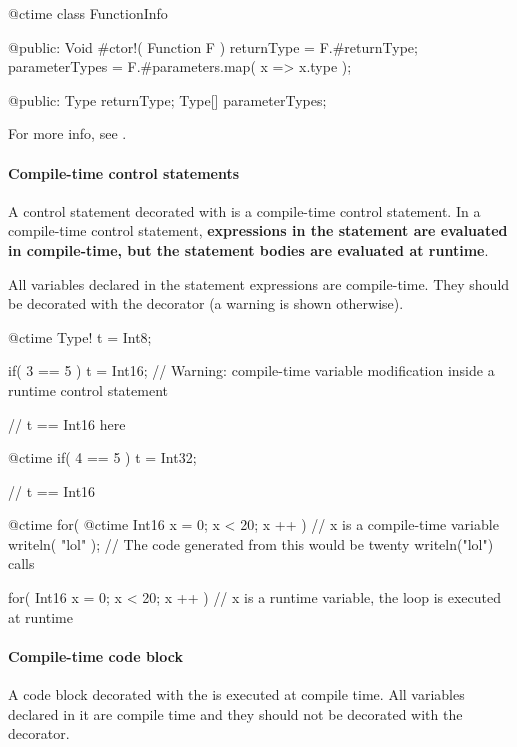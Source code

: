 \begin{code}
@ctime class FunctionInfo {

@public:
	Void #ctor!( Function F ) {
		returnType = F.#returnType;
		parameterTypes = F.#parameters.map( x => x.type );
	}
	
@public:
	Type returnType;
	Type[] parameterTypes;	
	
}
\end{code}

For more info, see .

\paragraph{Compile-time control statements}
A control statement decorated with  is a compile-time control statement. In a compile-time control statement, \textbf{expressions in the statement are evaluated in compile-time, but the statement bodies are evaluated at runtime}.

All variables declared in the statement expressions are compile-time. They should be decorated with the  decorator (a warning is shown otherwise).

\begin{code}
@ctime Type! t = Int8;

if( 3 == 5 )
	t = Int16; // Warning: compile-time variable modification inside a runtime control statement

// t == Int16 here

@ctime if( 4 == 5 )	
	t = Int32;
	
// t == Int16
\end{code}

\begin{code}
@ctime for( @ctime Int16 x = 0; x < 20; x ++ ) {
	// x is a compile-time variable
	writeln( "lol" );
	// The code generated from this would be twenty writeln("lol") calls
}

for( Int16 x = 0; x < 20; x ++ ) {
	// x is a runtime variable, the loop is executed at runtime	
}
\end{code}

\paragraph{Compile-time code block} A code block decorated with the  is executed at compile time. All variables declared in it are compile time and they should not be decorated with the  decorator.

